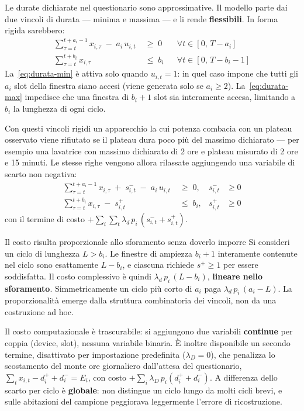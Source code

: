 Le durate dichiarate nel questionario sono approssimative. Il modello parte dai due vincoli di
durata --- minima e massima --- e li rende \textbf{flessibili}. In forma rigida sarebbero:
\begin{align}
  \sum_{\tau=t}^{t+a_i-1} x_{i,\tau} \;-\; a_i \, u_{i,t} &\;\ge\; 0
  && \forall t \in [0,\, T-a_i] \label{eq:durata-min}\\
  \sum_{\tau=t}^{t+b_i} x_{i,\tau} &\;\le\; b_i
  && \forall t \in [0,\, T-b_i-1] \label{eq:durata-max}
\end{align}
La~\eqref{eq:durata-min} è attiva solo quando $u_{i,t} = 1$: in quel caso impone che tutti gli
$a_i$ slot della finestra siano accesi (viene generata solo se $a_i \ge 2$). La~\eqref{eq:durata-max}
impedisce che una finestra di $b_i+1$ slot sia interamente accesa, limitando a $b_i$ la lunghezza
di ogni ciclo.

Con questi vincoli rigidi un apparecchio la cui potenza combacia con un plateau osservato viene
rifiutato se il plateau dura poco più del massimo dichiarato --- per esempio una lavatrice con
massimo dichiarato di 2 ore e plateau misurato di 2 ore e 15 minuti. Le stesse righe vengono
allora rilassate aggiungendo una variabile di scarto non negativa:
\begin{align}
  \sum_{\tau=t}^{t+a_i-1} x_{i,\tau} \;+\; s^{-}_{i,t} \;-\; a_i \, u_{i,t} &\;\ge\; 0,
  & s^{-}_{i,t} &\ge 0 \label{eq:soft-min}\\
  \sum_{\tau=t}^{t+b_i} x_{i,\tau} \;-\; s^{+}_{i,t} &\;\le\; b_i,
  & s^{+}_{i,t} &\ge 0 \label{eq:soft-max}
\end{align}
con il termine di costo $+ \sum_{i} \sum_{t} \lambda_d \, p_i \, ( s^{-}_{i,t} + s^{+}_{i,t} )$.

\begin{notebox}{Il costo risulta proporzionale allo sforamento senza doverlo imporre}
Si consideri un ciclo di lunghezza $L > b_i$. Le finestre di ampiezza $b_i+1$ interamente
contenute nel ciclo sono esattamente $L - b_i$, e ciascuna richiede $s^{+} \ge 1$ per essere
soddisfatta. Il costo complessivo è quindi $\lambda_d \, p_i \, (L - b_i)$, \textbf{lineare nello
sforamento}. Simmetricamente un ciclo più corto di $a_i$ paga $\lambda_d \, p_i \, (a_i - L)$. La
proporzionalità emerge dalla struttura combinatoria dei vincoli, non da una costruzione ad hoc.
\end{notebox}

Il costo computazionale è trascurabile: si aggiungono due variabili \textbf{continue} per coppia
(device, slot), nessuna variabile binaria. È inoltre disponibile un secondo termine, disattivato
per impostazione predefinita ($\lambda_D = 0$), che penalizza lo scostamento del monte ore
giornaliero dall'attesa del questionario, $\sum_t x_{i,t} - d^{+}_i + d^{-}_i = E_i$, con costo
$+\sum_i \lambda_D \, p_i (d^{+}_i + d^{-}_i)$. A differenza dello scarto per ciclo è \textbf{globale}:
non distingue un ciclo lungo da molti cicli brevi, e sulle abitazioni del campione peggiorava
leggermente l'errore di ricostruzione.

